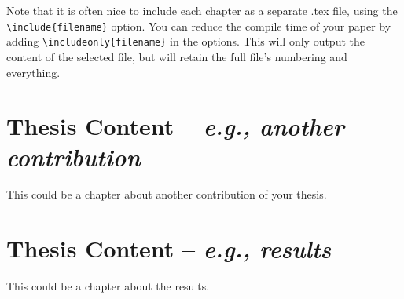 \documentclass[a4paper,12pt,twoside,openany]{book}
\newif\ifproposal
\begin{document}
\color{cyan}
    Note that it is often nice to include each chapter as a separate .tex file, using the \texttt{\textbackslash include\{filename\}} option.
    You can reduce the compile time of your paper by adding \texttt{\textbackslash includeonly\{filename\}} in the options. 
    This will only output the content of the selected file, but will retain the full file's numbering and everything.
\color{black}

\chapter{Thesis Content -- \textit{e.g., another contribution}}
\color{teal}
    This could be a chapter about another contribution of your thesis.
\color{black}

\chapter{Thesis Content -- \textit{e.g., results}}
\color{teal}
    This could be a chapter about the results.
\color{black}

\fi 


\ifproposal
    \chapter{Research Objective and Methodology}
    \section{Objectives}
        \label{sec_objectives}
        \color{teal}
            The main research objective of this work is to ...
        \color{black}
        
    \section{Methodology}
        \label{sec_methodology}
        \color{teal}
            The methodology for carrying out this research is ...
            \blue{It is good advice to use a flowchart to help describe the methodology.}
        \color{black}
    \clearpage
\fi
\end{document}
